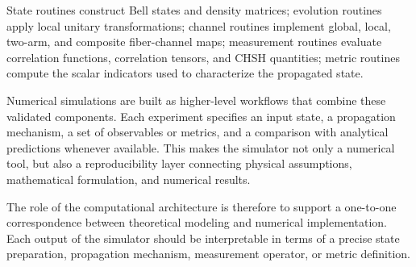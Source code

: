 \medskip

State routines construct Bell states and density matrices; evolution routines apply local unitary transformations; channel routines implement global, local, two-arm, and composite fiber-channel maps; measurement routines evaluate correlation functions, correlation tensors, and CHSH quantities; metric routines compute the scalar indicators used to characterize the propagated state.

\medskip

Numerical simulations are built as higher-level workflows that combine these validated components. Each experiment specifies an input state, a propagation mechanism, a set of observables or metrics, and a comparison with analytical predictions whenever available. This makes the simulator not only a numerical tool, but also a reproducibility layer connecting physical assumptions, mathematical formulation, and numerical results.

\medskip

The role of the computational architecture is therefore to support a one-to-one correspondence between theoretical modeling and numerical implementation. Each output of the simulator should be interpretable in terms of a precise state preparation, propagation mechanism, measurement operator, or metric definition.